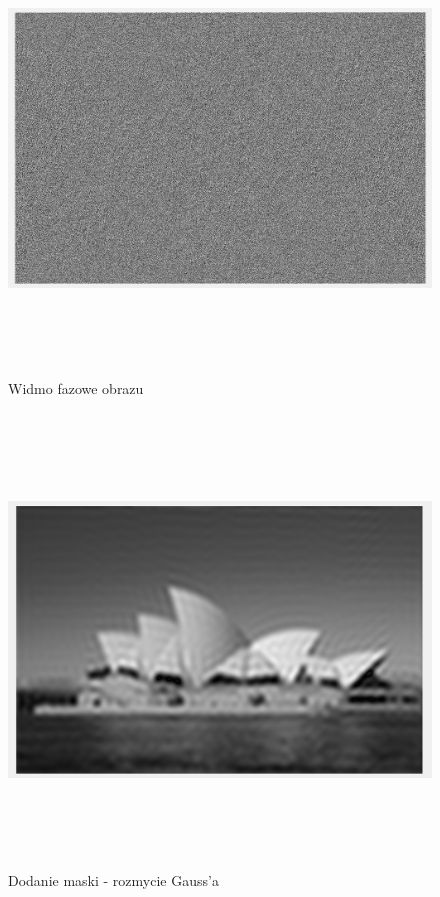 \documentclass[a4paper,12pt]{article}
\begin{document}
\begin{justify}
\newpage

\begin{figure}[h!]
\centering
\includegraphics[width=18cm, height=12cm]{widmo_faz}
\caption{Widmo fazowe obrazu}
\end{figure}

\newpage

\begin{figure}[h!]
\centering
\includegraphics[width=18cm, height=12cm]{rozmycie}
\caption{Dodanie maski - rozmycie Gauss'a}
\end{figure}


\end{justify}
\end{document}
